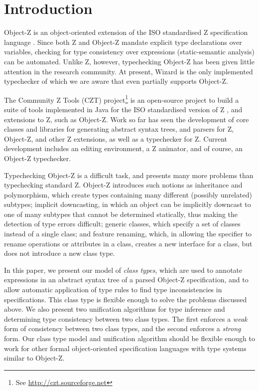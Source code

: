 \section{Introduction}

Object-Z \cite{smith00} is an object-oriented extension of the ISO
standardised Z specification language \cite{isoz}. Since both Z
and Object-Z mandate explicit type declarations over variables,
checking for type consistency over expressions (static-semantic
analysis) can be automated. Unlike Z, however, typechecking Object-Z
has been given little attention in the research community.  At
present, Wizard \cite{johnston96} is the only implemented typechecker
of which we are aware that even partially supports Object-Z.

The Community Z Tools (CZT) project\footnote{See
\url{http://czt.sourceforge.net}} is an open-source project to build a
suite of tools implemented in Java for the ISO standardised version of
Z \cite{isoz}, and extensions to Z, such as Object-Z. Work so far has
seen the development of core classes and libraries for generating
abstract syntax trees, and parsers for Z, Object-Z, and other Z
extensions, as well as a typechecker for Z. Current development
includes an editing environment, a Z animator, and of course, an
Object-Z typechecker.

Typechecking Object-Z is a difficult task, and presents many more
problems than typechecking standard Z. Object-Z introduces such
notions as inheritance and polymorphism, which create types containing
many different (possibly unrelated) subtypes; implicit downcasting, in
which an object can be implicitly downcast to one of many subtypes
that cannot be determined statically, thus making the detection of
type errors difficult; generic classes, which specify a set of classes
instead of a single class; and feature renaming, which, in allowing
the specifier to rename operations or attributes in a class, creates a
new interface for a class, but does not introduce a new class type.

In this paper, we present our model of {\em class types}, which are
used to annotate expressions in an abstract syntax tree of a parsed
Object-Z specification, and to allow automatic application of type
rules to find type inconsistencies in specifications. This class type
is flexible enough to solve the problems discussed above. We also
present two unification algorithms for type inference and determining
type consistency between two class types. The first enforces a {\em
weak} form of consistency between two class types, and the second
enforces a {\em strong} form. Our class type model and unification
algorithm should be flexible enough to work for other formal
object-oriented specification languages with type systems similar to
Object-Z.
